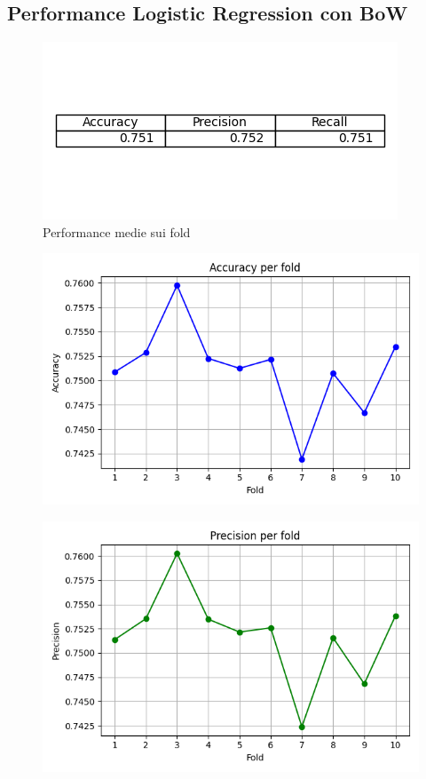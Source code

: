 \documentclass[12pt,a4paper]{report} %
\begin{document}
\subsection{Performance Logistic Regression con BoW}
\begin{figure}[H]
    \centering
    \includegraphics[width=0.75\linewidth]{immagini_modeling/lr.png}
    \caption{Performance medie sui fold}
    \label{fig:enter-label}
\end{figure}
\begin{figure}[H]
    \centering
    \includegraphics[width=0.75\linewidth]{immagini_modeling/lr_accuracy.png}
    \label{fig:enter-label}
\end{figure}
\begin{figure}[H]
    \centering
    \includegraphics[width=0.75\linewidth]{immagini_modeling/lr_precision.png}
    
    \label{fig:enter-label}
\end{figure}
\end{document}
